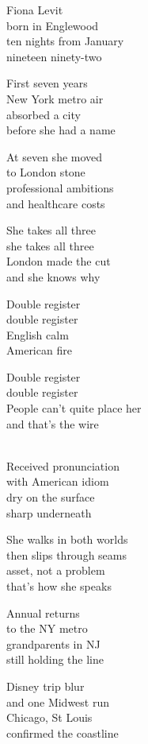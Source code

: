 \begin{lyrics}
Fiona Levit\\
born in Englewood\\
ten nights from January\\
nineteen ninety-two

First seven years\\
New York metro air\\
absorbed a city\\
before she had a name

At seven she moved\\
to London stone\\
professional ambitions\\
and healthcare costs

She takes all three\\
she takes all three\\
London made the cut\\
and she knows why

Double register\\
double register\\
English calm\\
American fire

Double register\\
double register\\
People can’t quite place her\\
and that’s the wire

\\
Received pronunciation\\
with American idiom\\
dry on the surface\\
sharp underneath

She walks in both worlds\\
then slips through seams\\
asset, not a problem\\
that’s how she speaks

Annual returns\\
to the NY metro\\
grandparents in NJ\\
still holding the line

Disney trip blur\\
and one Midwest run\\
Chicago, St Louis\\
confirmed the coastline


\end{lyrics}
